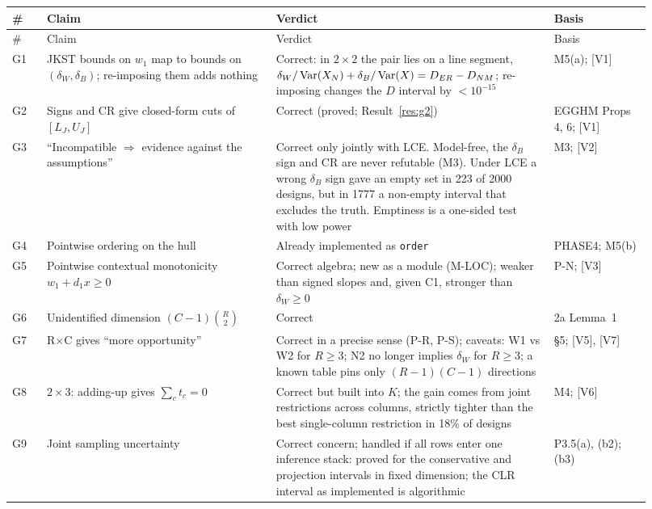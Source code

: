 {\small
\begin{longtable}{@{}L{0.05\linewidth}L{0.33\linewidth}L{0.40\linewidth}L{0.14\linewidth}@{}}
\toprule \# & Claim & Verdict & Basis \\ \midrule\endfirsthead
\toprule \# & Claim & Verdict & Basis \\ \midrule\endhead
G1 & JKST bounds on $w_1$ map to bounds on $(\delta_W,\delta_B)$; re-imposing them adds nothing & Correct: in $2\times2$ the pair lies on a line segment, $\delta_W/\operatorname{Var}(X_N)+\delta_B/\operatorname{Var}(X)=D_{ER}-D_{NM}$; re-imposing changes the $D$ interval by $<10^{-15}$ & M5(a); [V1] \\
G2 & Signs and CR give closed-form cuts of $[L_J,U_J]$ & Correct (proved; Result~\ref{res:g2}) & EGGHM Props 4, 6; [V1] \\
G3 & ``Incompatible $\Rightarrow$ evidence against the assumptions'' & Correct only jointly with LCE. Model-free, the $\delta_B$ sign and CR are never refutable (M3). Under LCE a wrong $\delta_B$ sign gave an empty set in 223 of 2000 designs, but in 1777 a non-empty interval that excludes the truth. Emptiness is a one-sided test with low power & M3; [V2] \\
G4 & Pointwise ordering on the hull & Already implemented as \texttt{order} & PHASE4; M5(b) \\
G5 & Pointwise contextual monotonicity $w_1+d_1x\ge0$ & Correct algebra; new as a module (M-LOC); weaker than signed slopes and, given C1, stronger than $\delta_W\ge0$ & P-N; [V3] \\
G6 & Unidentified dimension $(C-1)\binom R2$ & Correct & 2a Lemma~1 \\
G7 & R$\times$C gives ``more opportunity'' & Correct in a precise sense (P-R, P-S); caveats: W1 vs W2 for $R\ge3$; N2 no longer implies $\delta_W$ for $R\ge3$; a known table pins only $(R-1)(C-1)$ directions & \S5; [V5], [V7] \\
G8 & $2\times3$: adding-up gives $\sum_ct_c=0$ & Correct but built into $K$; the gain comes from joint restrictions across columns, strictly tighter than the best single-column restriction in 18\% of designs & M4; [V6] \\
G9 & Joint sampling uncertainty & Correct concern; handled if all rows enter one inference stack: proved for the conservative and projection intervals in fixed dimension; the CLR interval as implemented is algorithmic & P3.5(a), (b2); (b3) \\
\bottomrule
\end{longtable}
}

